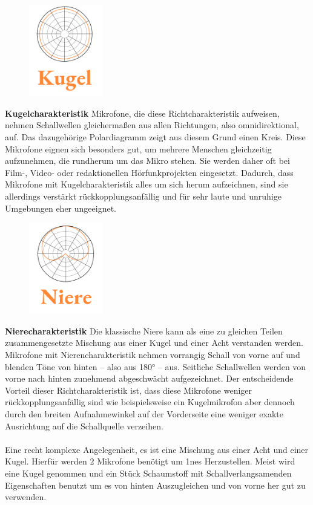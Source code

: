 \begin{figure}\vspace{-1cm}
\includegraphics[height=4cm]{Bilder/Medientechnik/Mikrocharakteristik_Kugel.png}
\end{figure}
 \textbf{Kugelcharakteristik} Mikrofone, die diese Richtcharakteristik aufweisen, nehmen Schallwellen gleichermaßen aus allen Richtungen, also omnidirektional, auf. Das dazugehörige Polardiagramm zeigt aus diesem Grund einen Kreis. Diese Mikrofone eignen sich besonders gut, um mehrere Menschen gleichzeitig aufzunehmen, die rundherum um das Mikro stehen. Sie werden daher oft bei Film-, Video- oder redaktionellen Hörfunkprojekten eingesetzt. Dadurch, dass Mikrofone mit Kugelcharakteristik alles um sich herum aufzeichnen, sind sie allerdings verstärkt rückkopplungsanfällig und für sehr laute und unruhige Umgebungen eher ungeeignet.\\

\begin{figure}\vspace{-1cm}
\includegraphics[height=4cm]{Bilder/Medientechnik/Mikrocharakteristik_Niere.png}
\end{figure}
 \textbf{Nierecharakteristik} Die klassische Niere kann als eine zu gleichen Teilen zusammengesetzte Mischung aus einer Kugel und einer Acht verstanden werden. Mikrofone mit Nierencharakteristik nehmen vorrangig Schall von vorne auf und blenden Töne von hinten – also aus 180° – aus. Seitliche Schallwellen werden von vorne nach hinten zunehmend abgeschwächt aufgezeichnet. Der entscheidende Vorteil dieser Richtcharakteristik ist, dass diese Mikrofone weniger rückkopplungsanfällig sind wie beispielsweise ein Kugelmikrofon aber dennoch durch den breiten Aufnahmewinkel auf der Vorderseite eine weniger exakte Ausrichtung auf die Schallquelle verzeihen.\\~\\Eine recht komplexe Angelegenheit, es ist eine Mischung aus einer Acht und einer Kugel. Hierfür werden 2 Mikrofone benötigt um 1nes Herzustellen.
Meist wird eine Kugel genommen und ein Stück Schaumstoff mit Schallverlangsamenden Eigenschaften benutzt um es von hinten Auszugleichen und von vorne her gut zu verwenden.\\

